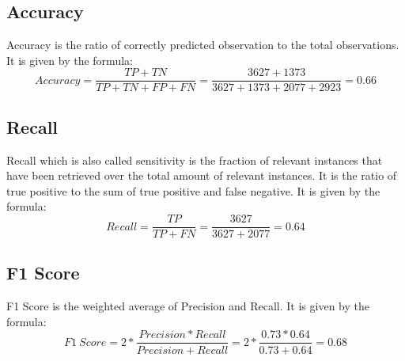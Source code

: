 \subsection*{Accuracy}
Accuracy is the ratio of correctly predicted observation to the total observations. It is given by the formula:
$$Accuracy = \frac{TP+TN}{TP+TN+FP+FN}= \frac{3627+1373}{3627+1373+2077+2923}=0.66$$
\subsection{Recall}
Recall which is also called sensitivity is the fraction of relevant instances that have been retrieved over the total amount of relevant instances. It is the ratio of true positive to the sum of true positive and false negative. It is given by the formula:
$$Recall = \frac{TP}{TP+FN} = \frac{3627}{3627+2077}= 0.64$$
\subsection{F1 Score}
F1 Score is the weighted average of Precision and Recall. It is given by the formula:
$$F1\ Score = 2*\frac{Precision*Recall}{Precision+Recall} = 2*\frac{0.73*0.64}{0.73+0.64} = 0.68$$







